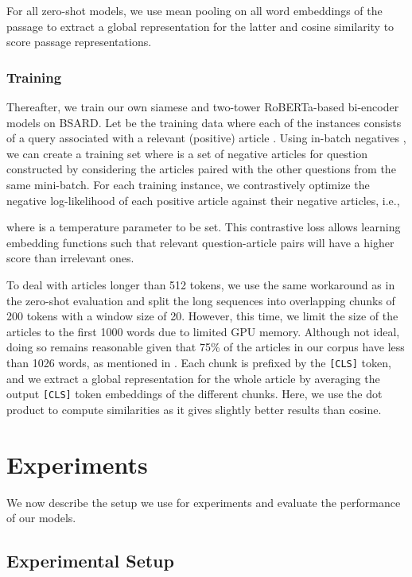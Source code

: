 \documentclass[11pt]{article}
\begin{document}
For all zero-shot models, we use mean pooling on all word embeddings of the passage to extract a global representation for the latter and cosine similarity to score passage representations.


\subsubsection{Training}
Thereafter, we train our own siamese and two-tower RoBERTa-based bi-encoder models on BSARD. Let  be the training data where each of the  instances consists of a query  associated with a relevant (positive) article . Using in-batch negatives \citep{chen2017sampling, henderson2017efficient}, we can create a training set  where  is a set of negative articles for question  constructed by considering the articles paired with the other questions from the same mini-batch. For each training instance, we contrastively optimize the negative log-likelihood of each positive article against their negative articles, i.e.,

where  is a temperature parameter to be set. This contrastive loss allows learning embedding functions such that relevant question-article pairs will have a higher score than irrelevant ones.

To deal with articles longer than 512 tokens, we use the same workaround as in the zero-shot evaluation and split the long sequences into overlapping chunks of 200 tokens with a window size of 20. However, this time, we limit the size of the articles to the first 1000 words due to limited GPU memory. Although not ideal, doing so remains reasonable given that 75\% of the articles in our corpus have less than 1026 words, as mentioned in . Each chunk is prefixed by the \texttt{[CLS]} token, and we extract a global representation for the whole article by averaging the output \texttt{[CLS]} token embeddings of the different chunks. Here, we use the dot product to compute similarities as it gives slightly better results than cosine.



\section{Experiments \label{sec:experiments}}
We now describe the setup we use for experiments and evaluate the performance of our models.

\subsection{Experimental Setup \label{subsec:experimental_setup}}
\end{document}
